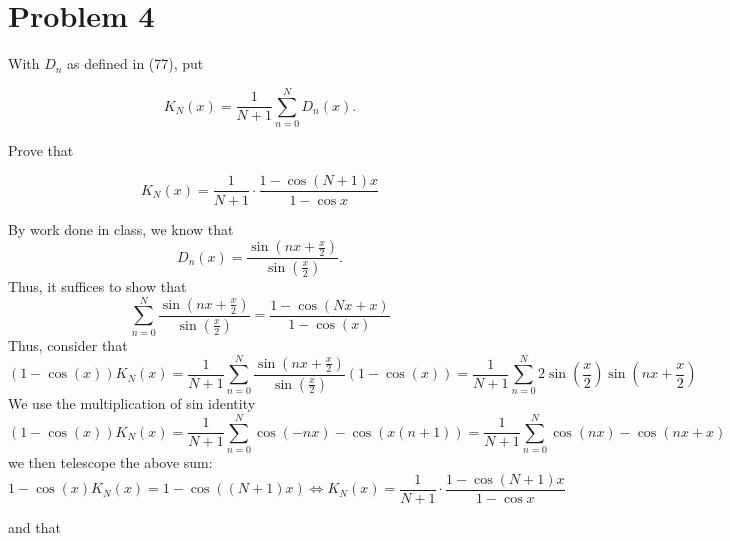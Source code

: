 \documentclass[11pt]{article}
\begin{document}
\section*{Problem 4}
\begin{problem}
    
With \( D_n \) as defined in (77), put


\[ K_N(x) = \frac{1}{N+1} \sum_{n=0}^{N} D_n(x). \]



Prove that


\[ K_N(x) = \frac{1}{N+1} \cdot \frac{1 - \cos (N+1)x}{1 - \cos x} \]
\begin{solution}
    By work done in class, we know that 
    \[D_n(x) = \frac{\sin(nx+\frac{x}{2})}{\sin(\frac{x}{2})}.\] Thus, it suffices to show that 
    \[\sum_{n=0}^N\frac{\sin(nx+\frac{x}{2})}{\sin(\frac{x}{2})} = \frac{1-\cos(Nx + x)}{1 - \cos(x)}\] Thus, consider that 
    \[(1-\cos(x))K_N(x) = \frac{1}{N+1}\sum_{n=0}^N\frac{\sin(nx+\frac{x}{2})}{\sin(\frac{x}{2})}(1-\cos(x)) = \frac{1}{N+1}\sum_{n=0}^N2\sin(\frac{x}{2})\sin(nx+\frac{x}{2})\]
    We use the multiplication of sin identity
    \[(1-\cos(x))K_N(x) = \frac{1}{N+1}\sum_{n=0}^N\cos(-nx) - \cos(x(n+1)) = \frac{1}{N+1}\sum_{n=0}^N\cos(nx) - \cos(nx+x)\] we then telescope the above sum:
    \[1 - \cos(x)K_N(x) = 1-\cos((N+1)x)\iff K_N(x) = \frac{1}{N+1} \cdot \frac{1 - \cos (N+1)x}{1 - \cos x}\]
\end{solution}



and that\end{problem}
\end{document}
